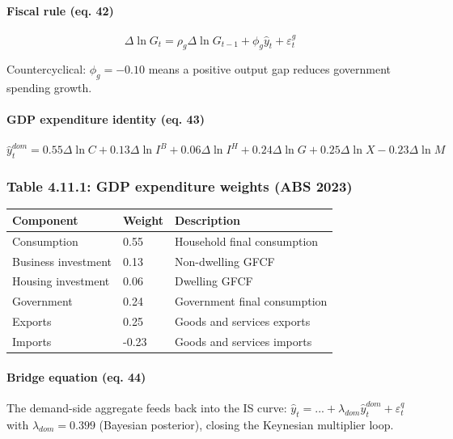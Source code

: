 \documentclass[
]{article}
\newcounter{none} %
\begin{document}
\paragraph{Fiscal rule (eq. 42)}\label{fiscal-rule-eq.-42}

\[\Delta \ln G_t = \rho_g \Delta \ln G_{t-1} + \phi_g \hat{y}_t + \varepsilon^g_t\]

Countercyclical: \(\phi_g = -0.10\) means a positive output gap reduces
government spending growth.

\paragraph{GDP expenditure identity (eq.
43)}\label{gdp-expenditure-identity-eq.-43}

\[\hat{y}^{dom}_t = 0.55 \Delta \ln C + 0.13 \Delta \ln I^B + 0.06 \Delta \ln I^H + 0.24 \Delta \ln G + 0.25 \Delta \ln X - 0.23 \Delta \ln M\]

\subsubsection{Table 4.11.1: GDP expenditure weights (ABS
2023)}\label{table-4.11.1-gdp-expenditure-weights-abs-2023}

{\def\LTcaptype{none} %
\begin{longtable}[]{@{}lll@{}}
\toprule\noalign{}
Component & Weight & Description \\
\midrule\noalign{}
\endhead
\bottomrule\noalign{}
\endlastfoot
Consumption & 0.55 & Household final consumption \\
Business investment & 0.13 & Non-dwelling GFCF \\
Housing investment & 0.06 & Dwelling GFCF \\
Government & 0.24 & Government final consumption \\
Exports & 0.25 & Goods and services exports \\
Imports & -0.23 & Goods and services imports \\
\end{longtable}
}

\paragraph{Bridge equation (eq. 44)}\label{bridge-equation-eq.-44}

The demand-side aggregate feeds back into the IS curve:
\(\hat{y}_t = ... + \lambda_{dom} \hat{y}^{dom}_t + \varepsilon^q_t\)
with \(\lambda_{dom} = 0.399\) (Bayesian posterior), closing the
Keynesian multiplier loop.
\end{document}
